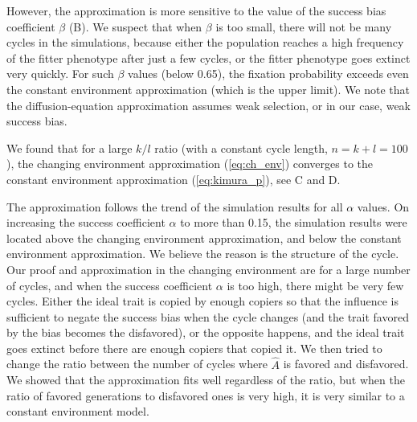 \documentclass[12pt]{extarticle}
\begin{document}
However, the approximation is more sensitive to the value of the success bias coefficient $\beta$ (B).
We suspect that when $\beta$ is too small, there will not be many cycles in the simulations, because either the population reaches a high frequency of the fitter phenotype after just a few cycles, or the fitter phenotype {goes} extinct very quickly. 
For such $\beta$ values (below 0.65), the fixation probability exceeds even the constant environment approximation (which is the upper limit). We note that the diffusion-equation approximation assumes weak selection, or in our case, weak success bias.

We found that for a large $k/l$ ratio (with a constant cycle length, $n=k+l=100$), the changing environment approximation (\cref{eq:ch_env}) converges to the constant environment approximation (\cref{eq:kimura_p}), see C and D.

The approximation follows the trend of the simulation results for all $\alpha$ values.
{On} increasing the success coefficient {$\alpha$} to more than 0.15, the simulation results were located above the changing environment approximation, and below the constant environment approximation. We believe the reason is the structure of the cycle.
Our proof and approximation in the changing environment are for a large {number} of cycles, and when the success coefficient {$\alpha$} is too high, there might be very few cycles. Either the ideal trait is copied by enough copiers so that the influence is sufficient to negate the success bias when the cycle changes (and the trait favored by the bias becomes the disfavored), or the opposite happens, and the ideal trait {goes} extinct before there {are} enough copiers that copied it.
We then tried to change the ratio between the number of cycles where $\hat{A}$ is favored and disfavored. We showed that the approximation fits well regardless of the ratio, but when the ratio of favored generations to disfavored ones is very high, it is very similar to a constant environment model.
\end{document}
